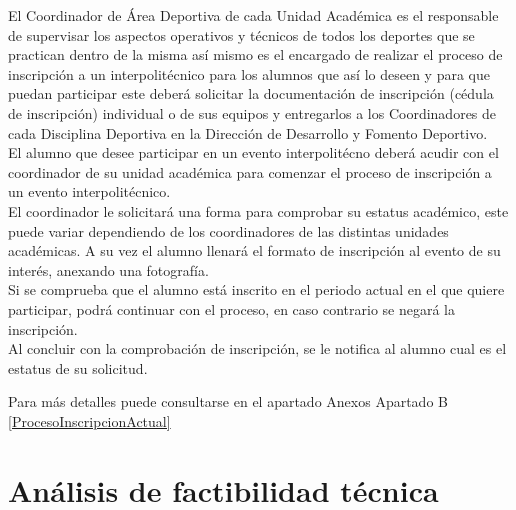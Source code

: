 	\noident El Coordinador de Área Deportiva de cada Unidad Académica es el responsable de supervisar los aspectos operativos y técnicos de todos los deportes que se practican dentro de la misma así mismo es el encargado de realizar el proceso de inscripción a un interpolitécnico para los alumnos que así lo deseen y para que puedan participar este deberá solicitar la documentación de inscripción (cédula de inscripción) individual o de sus equipos y entregarlos a los Coordinadores de cada Disciplina Deportiva en la Dirección de Desarrollo y Fomento Deportivo. \cite{Reglamento} \\
	\noident  El alumno que desee participar en un evento interpolitécno deberá acudir con el coordinador de su unidad académica para comenzar el proceso de inscripción a un evento interpolitécnico. 
	\\El coordinador le solicitará una forma para comprobar su estatus académico, este puede variar dependiendo de los coordinadores de las distintas unidades académicas. A su vez el alumno llenará el formato de inscripción al evento de su interés, anexando una fotografía. 
	\\ Si se comprueba que el alumno está inscrito en el periodo actual en el que quiere participar, podrá continuar con el proceso, en caso contrario se negará la inscripción. \cite{Reglamento}
	\\ Al concluir con la comprobación de inscripción, se le notifica al alumno cual es el estatus de su solicitud. 
	
	\noindent Para más detalles puede consultarse en el apartado Anexos Apartado B \ref{ProcesoInscripcionActual}
	
	
	
	\section{An\'alisis de factibilidad t\'ecnica}
	
	
